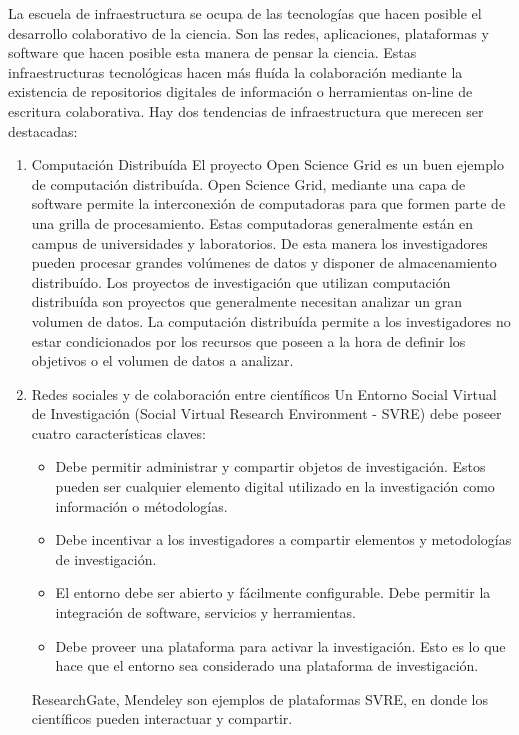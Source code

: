 \begin{itemize}
		La escuela de infraestructura se ocupa de las tecnologías que hacen posible el desarrollo colaborativo de la ciencia. Son las redes, aplicaciones, plataformas y software que hacen posible esta manera de pensar la ciencia. Estas infraestructuras tecnológicas hacen más fluída la colaboración mediante la existencia de repositorios digitales de información o herramientas on-line de escritura colaborativa. Hay dos tendencias de infraestructura que merecen ser destacadas:
		\begin{enumerate}
			\item {Computación Distribuída}
			El proyecto Open Science Grid es un buen ejemplo de computación distribuída. Open Science Grid, mediante una capa de software permite la interconexión de computadoras para que  formen parte de una grilla de procesamiento. Estas computadoras generalmente están en campus de universidades y laboratorios. De esta manera los investigadores pueden procesar grandes volúmenes de datos y disponer de almacenamiento distribuído. Los proyectos de investigación que utilizan computación distribuída son proyectos que generalmente necesitan analizar un gran volumen de datos. La computación distribuída permite a los investigadores no estar condicionados por los recursos que poseen a la hora de definir los objetivos o el volumen de datos a analizar.
			\item {Redes sociales y de colaboración entre científicos}
			Un Entorno Social Virtual de Investigación (Social Virtual Research Environment - SVRE) debe poseer cuatro características claves:
			\begin{itemize}
				\item Debe permitir administrar y compartir objetos de investigación. Estos pueden ser cualquier elemento digital utilizado en la investigación como información o métodologías.
				\item Debe incentivar a los investigadores a compartir elementos y metodologías de investigación.
				\item El entorno debe ser abierto y fácilmente configurable. Debe permitir la integración de software, servicios y herramientas.
				\item Debe proveer una plataforma para activar la investigación. Esto es lo que hace que el entorno sea considerado una plataforma de investigación.				
			\end{itemize}	
			ResearchGate, Mendeley son ejemplos de plataformas SVRE, en donde los científicos pueden interactuar y compartir.
		\end{enumerate}
		
		
\end{itemize}	
	

